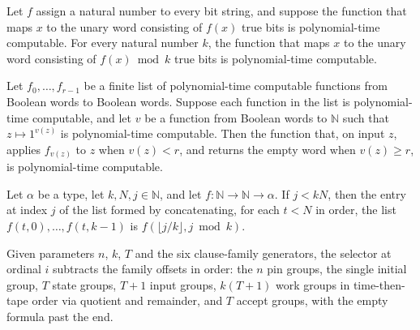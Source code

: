 \begin{lemma}
\label{Complexity.clA5Mod_native}
\leanok
{}
Let $f$ assign a natural number to every bit string, and suppose the function that maps
$x$ to the unary word consisting of $f(x)$ true bits is polynomial-time computable. For
every natural number $k$, the function that maps $x$ to the unary word consisting of
$f(x)\bmod k$ true bits is polynomial-time computable.
\end{lemma}

\begin{lemma}
\label{Complexity.clA5Select_native}
\leanok
{}
Let $f_0,\ldots,f_{r-1}$ be a finite list of polynomial-time computable functions from
Boolean words to Boolean words. Suppose each function in the list is polynomial-time
computable, and let $v$ be a function from Boolean words to $\mathbb{N}$ such that
$z\mapsto 1^{v(z)}$ is polynomial-time computable. Then the function that, on input $z$,
applies $f_{v(z)}$ to $z$ when $v(z)<r$, and returns the empty word when $v(z)\ge r$, is
polynomial-time computable.
\end{lemma}

\begin{lemma}
\label{Complexity.clA5Work_get}
\leanok
{}
Let $\alpha$ be a type, let $k,N,j\in\mathbb{N}$, and let
$f:\mathbb{N}\to\mathbb{N}\to\alpha$. If $j<kN$, then the entry at index $j$ of the list
formed by concatenating, for each $t<N$ in order, the list $f(t,0),\ldots,f(t,k-1)$ is
$f(\lfloor j/k\rfloor,j\bmod k)$.
\end{lemma}

\begin{definition}
\label{Complexity.clA5GroupAt}
\leanok
Given parameters $n$, $k$, $T$ and the six clause-family generators, the selector at ordinal $i$ subtracts the family offsets in order: the $n$ pin groups, the single initial group, $T$ state groups, $T+1$ input groups, $k(T+1)$ work groups in time-then-tape order via quotient and remainder, and $T$ accept groups, with the empty formula past the end.
\end{definition}

